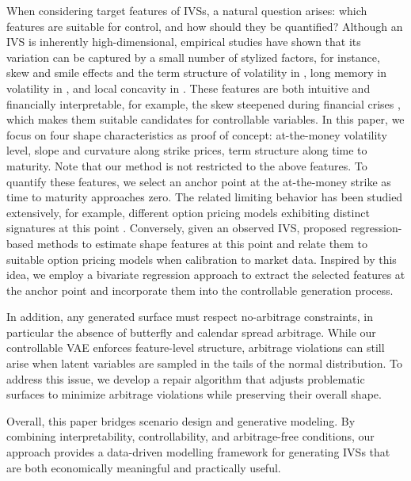 \documentclass{article}
\begin{document}
When considering target features of IVSs, a natural question arises: which features are suitable for control, and how should they be quantified? Although an IVS is inherently high-dimensional, empirical studies have shown that its variation can be captured by a small number of stylized factors, for instance, skew and smile effects and the term structure of volatility in \citep{cont2002dynamics}, long memory in volatility in \citep{Bayer02062016}, and local concavity in \citep{franccois2022venturing}. These features are both intuitive and financially interpretable, for example, the skew steepened during financial crises \citep{constantinides2015supply}, which makes them suitable candidates for controllable variables.
In this paper,   we focus on four shape characteristics as proof of concept: at-the-money volatility level, slope and curvature along strike prices, term structure along time to maturity. Note that our method is not restricted to the above features.  To quantify these features, we select an anchor point at the at-the-money strike as time to maturity approaches zero. The related limiting behavior has been studied extensively, for example,  different option pricing models exhibiting distinct signatures at this point \citep{carr2003type, ait2021implied}. Conversely, given an observed IVS, \citep{ait2021implied} proposed regression-based methods to estimate shape features at this point and relate them to suitable option pricing models when calibration to market data. Inspired by this idea, we employ a bivariate regression approach to extract the selected features at the anchor point and incorporate them into the controllable generation process.


In addition, any generated surface must respect no-arbitrage constraints, in particular the absence of butterfly and calendar spread arbitrage. While our controllable VAE enforces feature-level structure, arbitrage violations can still arise when latent variables are sampled in the tails of the normal distribution. To address this issue, we develop a repair algorithm that adjusts problematic surfaces to minimize arbitrage violations while preserving their overall shape.

Overall, this paper bridges scenario design and generative modeling. By combining interpretability, controllability, and arbitrage-free conditions, our approach provides a data-driven modelling framework for generating IVSs that are both economically meaningful and practically useful.
\end{document}
